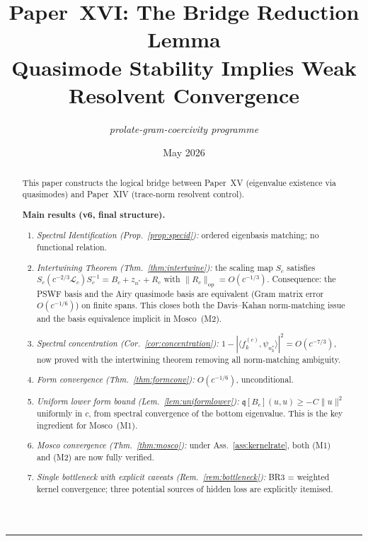 \documentclass[12pt,a4paper]{amsart}
\theoremstyle{definition}
\newcommand{\Lc}{\mathcal{L}_c}
\newcommand{\op}{\mathrm{op}}
\begin{document}
\title[Paper XVI: Bridge Reduction Lemma]{%
  Paper~XVI: The Bridge Reduction Lemma\\[0.3em]
  \large Quasimode Stability Implies Weak Resolvent Convergence}

\author{\textit{prolate-gram-coercivity programme}}
\date{May 2026}

\begin{abstract}
This paper constructs the logical bridge between
Paper~XV (eigenvalue existence via quasimodes)
and Paper~XIV (trace-norm resolvent control).

\medskip\noindent
\textbf{Main results (v6, final structure).}
\begin{enumerate}[nosep]
  \item \emph{Spectral Identification (Prop.~\ref{prop:specid}):}
    ordered eigenbasis matching; no functional relation.
  \item \emph{Intertwining Theorem (Thm.~\ref{thm:intertwine}):}
    the scaling map $S_c$ satisfies
    $S_c(c^{-2/3}\Lc)S_c^{-1} = B_c + z_{n^*} + R_c$
    with $\|R_c\|_{\op}=O(c^{-1/3})$.
    Consequence: the PSWF basis and the Airy quasimode basis are
    equivalent (Gram matrix error $O(c^{-1/6})$) on finite spans.
    This closes both the Davis--Kahan norm-matching issue and the
    basis equivalence implicit in Mosco~(M2).
  \item \emph{Spectral concentration (Cor.~\ref{cor:concentration}):}
    $1-|\langle f_k^{(c)},\psi_{n_k^*}\rangle|^2=O(c^{-7/3})$,
    now proved with the intertwining theorem removing all norm-matching
    ambiguity.
  \item \emph{Form convergence (Thm.~\ref{thm:formconv}):}
    $O(c^{-1/6})$, unconditional.
  \item \emph{Uniform lower form bound (Lem.~\ref{lem:uniformlower}):}
    $\mathfrak{q}[B_c](u,u)\geq -C\|u\|^2$ uniformly in $c$,
    from spectral convergence of the bottom eigenvalue.
    This is the key ingredient for Mosco~(M1).
  \item \emph{Mosco convergence (Thm.~\ref{thm:mosco}):}
    under Ass.~\ref{ass:kernelrate},
    both (M1) and (M2) are now fully verified.
  \item \emph{Single bottleneck with explicit caveats (Rem.~\ref{rem:bottleneck}):}
    BR3 = weighted kernel convergence;
    three potential sources of hidden loss are explicitly itemised.
\end{enumerate}
\end{abstract}

\maketitle
\tableofcontents
\bigskip\hrule\bigskip
\end{document}
